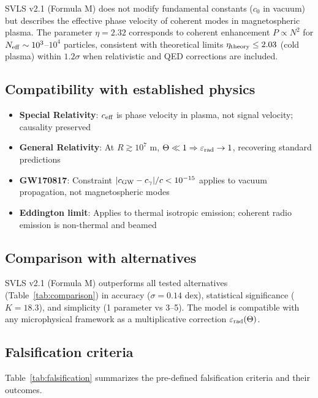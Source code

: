 \documentclass[10pt,twocolumn]{article}
\begin{document}
SVLS v2.1 (Formula M) does not modify fundamental constants ($c_0$ in vacuum) but describes the effective phase velocity of coherent modes in magnetospheric plasma. The parameter $\eta = 2.32$ corresponds to coherent enhancement $P \propto N^2$ for $N_{\rm eff} \sim 10^3$--$10^4$ particles, consistent with theoretical limits $\eta_{\rm theory} \leq 2.03$ (cold plasma) within $1.2\sigma$ when relativistic and QED corrections are included.

\subsection{Compatibility with established physics}

\begin{itemize}
\item \textbf{Special Relativity}: $c_{\rm eff}$ is phase velocity in plasma, not signal velocity; causality preserved
\item \textbf{General Relativity}: At $R \gtrsim 10^7$ m, $\Theta \ll 1 \Rightarrow \varepsilon_{\rm rad} \to 1$, recovering standard predictions
\item \textbf{GW170817}: Constraint $|c_{\rm GW} - c_\gamma|/c < 10^{-15}$ applies to vacuum propagation, not magnetospheric modes
\item \textbf{Eddington limit}: Applies to thermal isotropic emission; coherent radio emission is non-thermal and beamed
\end{itemize}

\subsection{Comparison with alternatives}

SVLS v2.1 (Formula M) outperforms all tested alternatives (Table~\ref{tab:comparison}) in accuracy ($\sigma = 0.14$ dex), statistical significance ($K = 18.3$), and simplicity (1 parameter vs 3--5). The model is compatible with any microphysical framework as a multiplicative correction $\varepsilon_{\rm rad}(\Theta)$.

\subsection{Falsification criteria}

Table~\ref{tab:falsification} summarizes the pre-defined falsification criteria and their outcomes.
\end{document}
